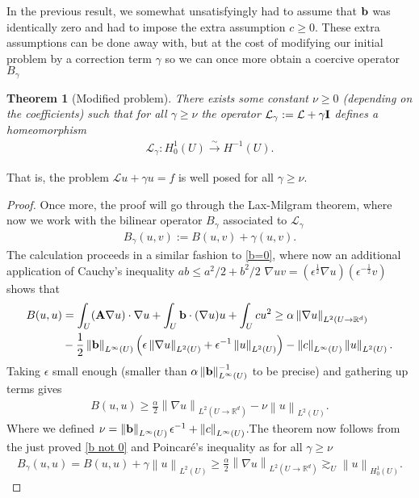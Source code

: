 \documentclass[
    a4paper,
    DIV=14,
    abstract=true,
    numbers=noenddot
]
{scrartcl}
\newtheorem{theorem}{Theorem}[section]
\theoremstyle{definition}
\newcommand{\qt}[1]{\left(#1\right)}
\renewcommand{\norm}[1]{\left\lVert #1 \right\rVert}\renewcommand{\abs}[1]{\left| #1 \right|}
\newcommand{\iso}{\xrightarrow{\sim}}
\newcommand{\R}{\mathbb{R}}
\newcommand{\Ll}{\mathcal{L}}
\begin{document}
In the previous result, we somewhat unsatisfyingly had to assume that $ \vb{b}$ was identically zero and had to impose the extra assumption  $c \geq 0$. These extra assumptions can be done away with, but at the cost of modifying our initial problem by a correction term $\gamma $ so we can once more obtain a coercive operator $B_\gamma $
\begin{theorem}[Modified problem]\label{mod}
	There exists some constant $\nu \geq 0$ (depending on the coefficients) such that for all $\gamma \geq \nu$  the operator $\Ll_\gamma := \Ll + \gamma \vb{I}$ defines a homeomorphism
	\begin{align*}
		\Ll_\gamma : H_0^1(U) \iso  H^{-1}(U).
	\end{align*}
\end{theorem}
That is, the problem $\Ll u +\gamma u =f$ is well posed for all $\gamma \geq \nu$.
\begin{proof}
	Once more, the proof will go through the Lax-Milgram theorem, where now we work with the bilinear operator $B_\gamma  $ associated to $\Ll_\gamma  $
	\begin{align*}
		B_\gamma  (u,v):= B(u,v) + \gamma  (u,v).
	\end{align*}
	The calculation proceeds in a similar fashion to  \eqref{b=0}, where now an additional application of Cauchy's inequality $ab\leq a^2/2+b^2/2$ $\nabla u v = (\epsilon^{\frac{1}{2}} \nabla u)(\epsilon^{-\frac{1}{2}}v)$  shows that
	\begin{align*}
		B(u,u) & = \int_{U}(\vb{A} \nabla u) \cdot \nabla u + \int_{U} \vb{b}\cdot  (\nabla u) u +  \int_{U} cu^2 \geq \alpha \norm{\nabla u}_{L^2(U \to \R^d)}              \\
		       & - \frac{1}{2}\norm{\vb{b}}_{L^\infty(U)} \qt{\epsilon \norm{\nabla u}_{L^2(U)}+ \epsilon ^{-1}\norm{u}_{L^2(U)}}- \norm{c}_{L^\infty(U)}\norm{u}_{L^2(U)} .
	\end{align*}
	Taking $\epsilon $ small enough (smaller than $ \alpha \norm{\vb{b}}_{L^\infty(U)}^{-1}$ to be precise) and gathering up terms gives
	\begin{align}\label{b not 0}
		B(u,u) \geq \frac{\alpha}{2} \norm{\nabla u}_{L^2(U \to \R^d)} -\nu \norm{u}_{L^2(U)}.
	\end{align}
	Where we defined $\nu = \norm{\vb{b}}_{L^\infty(U)} \epsilon ^{-1}+\norm{c}_{L^\infty(U)}$.The theorem now follows from the just proved \eqref{b not 0} and Poincaré's inequality as for all $\gamma \geq \nu$
	\begin{align*}
		B_\gamma (u,u)=B(u,u)+ \gamma \norm{u}_{L^2(U)} \geq\frac{\alpha}{2} \norm{\nabla u}_{L^2(U \to \R^d)}\gtrsim _U \norm{u}_{H_0^1(U)} .
	\end{align*}
\end{proof}
\end{document}
